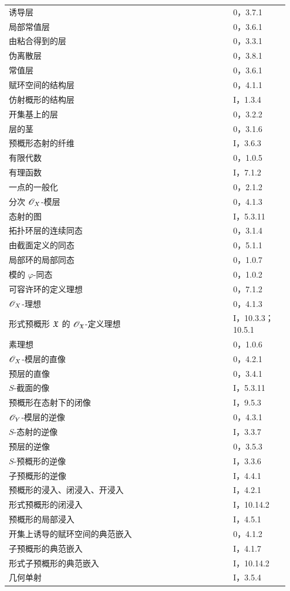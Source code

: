 \begin{longtable}{@{}p{0.76\linewidth}p{0.19\linewidth}@{}}
诱导层&0，3.7.1\\
局部常值层&0，3.6.1\\
由粘合得到的层&0，3.3.1\\
伪离散层&0，3.8.1\\
常值层&0，3.6.1\\
赋环空间的结构层&0，4.1.1\\
仿射概形的结构层&I，1.3.4\\
开集基上的层&0，3.2.2\\
层的茎&0，3.1.6\\
预概形态射的纤维&I，3.6.3\\
有限代数&0，1.0.5\\
有理函数&I，7.1.2\\
一点的一般化&0，2.1.2\\
分次 $\mathscr O_X$-模层&0，4.1.3\\
态射的图&I，5.3.11\\
拓扑环层的连续同态&0，3.1.4\\
由截面定义的同态&0，5.1.1\\
局部环的局部同态&0，1.0.7\\
模的 $\varphi$-同态&0，1.0.2\\
可容许环的定义理想&0，7.1.2\\
$\mathscr O_X$-理想&0，4.1.3\\
形式预概形 $\mathfrak X$ 的 $\mathscr O_{\mathfrak X}$-定义理想&I，10.3.3；10.5.1\\
素理想&0，1.0.6\\
$\mathscr O_X$-模层的直像&0，4.2.1\\
预层的直像&0，3.4.1\\
$S$-截面的像&I，5.3.11\\
预概形在态射下的闭像&I，9.5.3\\
$\mathscr O_Y$-模层的逆像&0，4.3.1\\
$S$-态射的逆像&I，3.3.7\\
预层的逆像&0，3.5.3\\
$S$-预概形的逆像&I，3.3.6\\
子预概形的逆像&I，4.4.1\\
预概形的浸入、闭浸入、开浸入&I，4.2.1\\
形式预概形的闭浸入&I，10.14.2\\
预概形的局部浸入&I，4.5.1\\
开集上诱导的赋环空间的典范嵌入&0，4.1.2\\
子预概形的典范嵌入&I，4.1.7\\
形式子预概形的典范嵌入&I，10.14.2\\
几何单射&I，3.5.4\\

\end{longtable}
